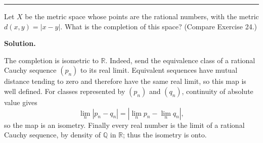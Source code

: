 \documentclass[12pt]{article}
\theoremstyle{definition}
\begin{document}
\bigskip\noindent\hrule\bigskip

Let $X$ be the metric space whose points are the rational numbers, with the metric $d(x,y)=\left\vert x-y\right\vert$. What is the completion of this space? (Compare Exercise 24.)

\smallskip
\noindent\textbf{Solution.}\quad

The completion is isometric to $\mathbb{R}$.  Indeed, send the
equivalence class of a rational Cauchy sequence $(p_n)$ to its real
limit.  Equivalent sequences have mutual distance tending to zero and
therefore have the same real limit, so this map is well defined.  For
classes represented by $(p_n)$ and $(q_n)$, continuity of absolute value
gives
\[
 \lim_n |p_n-q_n|=\left|\lim_n p_n-\lim_n q_n\right|,
\]
so the map is an isometry.  Finally every real number is the limit of a
rational Cauchy sequence, by density of $\mathbb{Q}$ in $\mathbb{R}$;
thus the isometry is onto.
\end{document}

